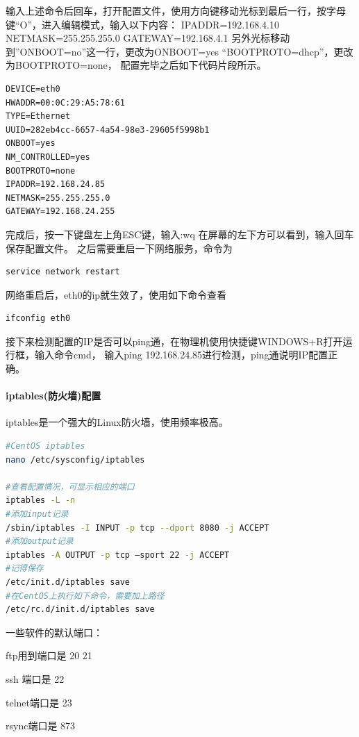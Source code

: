 \documentclass{book}
\begin{document}
输入上述命令后回车，打开配置文件，使用方向键移动光标到最后一行，按字母键“O”，进入编辑模式，输入以下内容：
IPADDR=192.168.4.10
NETMASK=255.255.255.0
GATEWAY=192.168.4.1
另外光标移动到”ONBOOT=no”这一行，更改为ONBOOT=yes
“BOOTPROTO=dhcp”，更改为BOOTPROTO=none，
配置完毕之后如下代码片段所示。

\begin{lstlisting}
DEVICE=eth0
HWADDR=00:0C:29:A5:78:61
TYPE=Ethernet
UUID=282eb4cc-6657-4a54-98e3-29605f5998b1
ONBOOT=yes
NM_CONTROLLED=yes
BOOTPROTO=none
IPADDR=192.168.24.85
NETMASK=255.255.255.0
GATEWAY=192.168.24.255
\end{lstlisting}

完成后，按一下键盘左上角ESC键，输入:wq 在屏幕的左下方可以看到，输入回车保存配置文件。
之后需要重启一下网络服务，命令为

\begin{lstlisting}[language=Bash]
service network restart
\end{lstlisting}

网络重启后，eth0的ip就生效了，使用如下命令查看

\begin{lstlisting}[language=Bash]
ifconfig eth0
\end{lstlisting}
 
接下来检测配置的IP是否可以ping通，在物理机使用快捷键WINDOWS+R打开运行框，输入命令cmd，
输入ping 192.168.24.85进行检测，ping通说明IP配置正确。

\paragraph{iptables(防火墙)配置}iptables是一个强大的Linux防火墙，使用频率极高。

\begin{lstlisting}[language=Bash]
#CentOS iptables
nano /etc/sysconfig/iptables

#查看配置情况，可显示相应的端口
iptables -L -n
#添加input记录
/sbin/iptables -I INPUT -p tcp --dport 8080 -j ACCEPT
#添加output记录
iptables -A OUTPUT -p tcp –sport 22 -j ACCEPT
#记得保存
/etc/init.d/iptables save
#在CentOS上执行如下命令，需要加上路径
/etc/rc.d/init.d/iptables save
\end{lstlisting}


一些软件的默认端口：

ftp用到端口是 20 21

ssh 端口是 22

telnet端口是 23

rsync端口是 873
\end{document}
